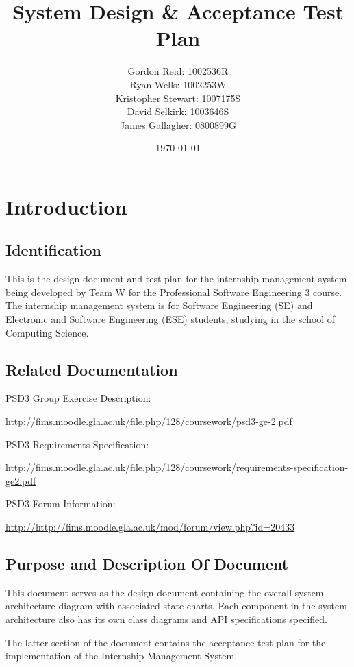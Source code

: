 \documentclass[11pt]{l3deliverable}
\title{System Design \& Acceptance Test Plan}
\author{
    Gordon Reid: 1002536R\\
    Ryan Wells: 1002253W\\
    Kristopher Stewart: 1007175S\\
    David Selkirk: 1003646S\\
    James Gallagher: 0800899G\\
}
\date{\today}
\begin{document}
\maketitle

\newpage

\tableofcontents

\newpage

\section{Introduction}

\subsection{Identification}

This is the design document and test plan for the internship management system
being developed by Team W for the Professional Software Engineering 3 course.
The internship management system is for Software Engineering (SE) and Electronic
and Software Engineering (ESE) students, studying in the school of Computing
Science.

\subsection{Related Documentation}

PSD3 Group Exercise Description:

\url{http://fims.moodle.gla.ac.uk/file.php/128/coursework/psd3-ge-2.pdf}

PSD3 Requirements Specification:

\url{http://fims.moodle.gla.ac.uk/file.php/128/coursework/requirements-specification-ge2.pdf}

PSD3 Forum Information:

\url{http://http://fims.moodle.gla.ac.uk/mod/forum/view.php?id=20433}

\subsection{Purpose and Description Of Document}

This document serves as the design document containing the overall system
architecture diagram with associated state charts. Each component in the
system architecture also has its own class diagrams and API specifications
specified.

The latter section of the document contains the acceptance test plan for
the implementation of the Internship Management System.
\end{document}
